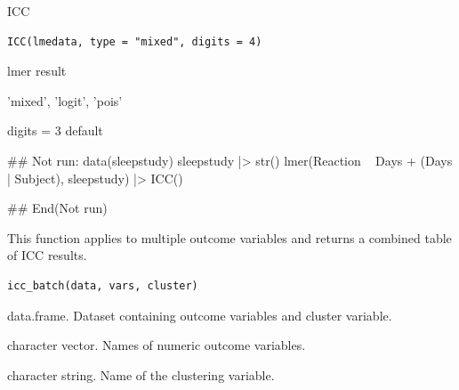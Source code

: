 \documentclass[a4paper]{book}
\begin{document}
%
\begin{Description}
ICC
\end{Description}
%
\begin{Usage}
\begin{verbatim}
ICC(lmedata, type = "mixed", digits = 4)
\end{verbatim}
\end{Usage}
%
\begin{Arguments}
\begin{ldescription}
\item[\code{lmedata}] lmer result

\item[\code{type}] 'mixed', 'logit', 'pois'

\item[\code{digits}] digits = 3 default
\end{ldescription}
\end{Arguments}
%
\begin{Examples}
\begin{ExampleCode}
## Not run: 
data(sleepstudy)
sleepstudy |> str()
lmer(Reaction ~ Days + (Days | Subject), sleepstudy) |> ICC()



## End(Not run)
\end{ExampleCode}
\end{Examples}
%
\begin{Description}
This function applies  to multiple outcome variables
and returns a combined table of ICC results.
\end{Description}
%
\begin{Usage}
\begin{verbatim}
icc_batch(data, vars, cluster)
\end{verbatim}
\end{Usage}
%
\begin{Arguments}
\begin{ldescription}
\item[\code{data}] data.frame. Dataset containing outcome variables and cluster variable.

\item[\code{vars}] character vector. Names of numeric outcome variables.

\item[\code{cluster}] character string. Name of the clustering variable.
\end{ldescription}
\end{Arguments}
\end{document}
